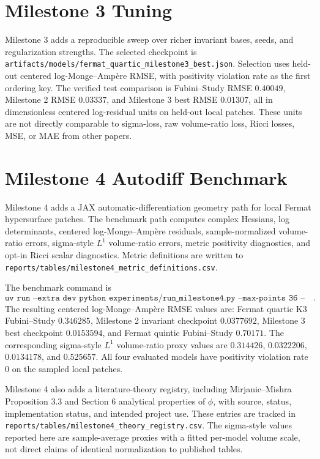 \documentclass{article}
\begin{document}
\section{Milestone 3 Tuning}
Milestone 3 adds a reproducible sweep over richer invariant bases, seeds, and regularization strengths. The selected checkpoint is \texttt{artifacts/models/fermat\_quartic\_milestone3\_best.json}. Selection uses held-out centered log-Monge--Ampère RMSE, with positivity violation rate as the first ordering key. The verified test comparison is Fubini--Study RMSE $0.40049$, Milestone 2 RMSE $0.03337$, and Milestone 3 best RMSE $0.01307$, all in dimensionless centered log-residual units on held-out local patches. These units are not directly comparable to sigma-loss, raw volume-ratio loss, Ricci losses, MSE, or MAE from other papers.

\section{Milestone 4 Autodiff Benchmark}
Milestone 4 adds a JAX automatic-differentiation geometry path for local Fermat hypersurface patches. The benchmark path computes complex Hessians, log determinants, centered log-Monge--Ampère residuals, sample-normalized volume-ratio errors, sigma-style $L^1$ volume-ratio errors, metric positivity diagnostics, and opt-in Ricci scalar diagnostics. Metric definitions are written to \texttt{reports/tables/milestone4\_metric\_definitions.csv}.

The benchmark command is
\[
\texttt{uv run --extra dev python experiments/run\_milestone4.py --max-points 36 --sample-count 120 --ricci-points 1}.
\]
The resulting centered log-Monge--Ampère RMSE values are: Fermat quartic K3 Fubini--Study $0.346285$, Milestone 2 invariant checkpoint $0.0377692$, Milestone 3 best checkpoint $0.0153594$, and Fermat quintic Fubini--Study $0.70171$. The corresponding sigma-style $L^1$ volume-ratio proxy values are $0.314426$, $0.0322206$, $0.0134178$, and $0.525657$. All four evaluated models have positivity violation rate $0$ on the sampled local patches.

Milestone 4 also adds a literature-theory registry, including Mirjanic--Mishra Proposition 3.3 and Section 6 analytical properties of $\phi$, with source, status, implementation status, and intended project use. These entries are tracked in \texttt{reports/tables/milestone4\_theory\_registry.csv}. The sigma-style values reported here are sample-average proxies with a fitted per-model volume scale, not direct claims of identical normalization to published tables.
\end{document}
